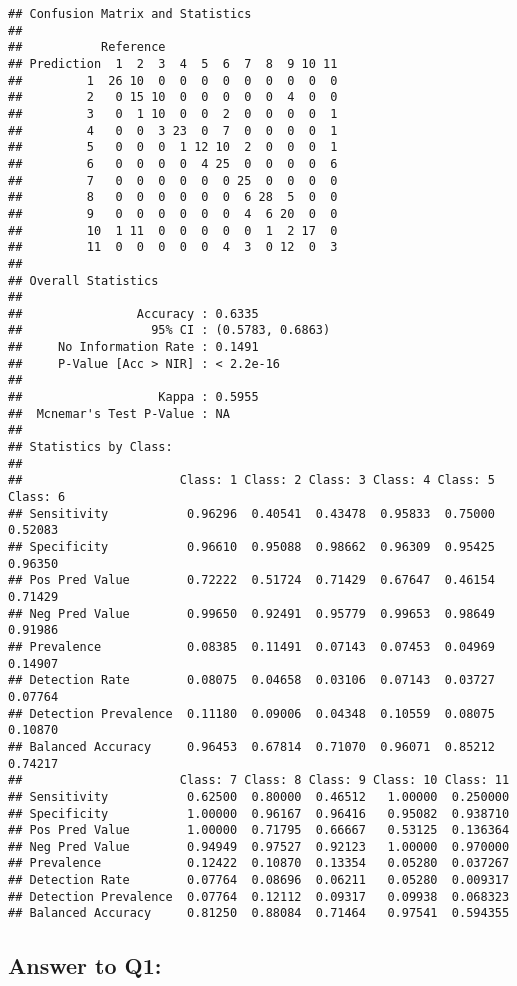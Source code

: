 \documentclass[]{article}
\begin{document}
\begin{verbatim}
## Confusion Matrix and Statistics
## 
##           Reference
## Prediction  1  2  3  4  5  6  7  8  9 10 11
##         1  26 10  0  0  0  0  0  0  0  0  0
##         2   0 15 10  0  0  0  0  0  4  0  0
##         3   0  1 10  0  0  2  0  0  0  0  1
##         4   0  0  3 23  0  7  0  0  0  0  1
##         5   0  0  0  1 12 10  2  0  0  0  1
##         6   0  0  0  0  4 25  0  0  0  0  6
##         7   0  0  0  0  0  0 25  0  0  0  0
##         8   0  0  0  0  0  0  6 28  5  0  0
##         9   0  0  0  0  0  0  4  6 20  0  0
##         10  1 11  0  0  0  0  0  1  2 17  0
##         11  0  0  0  0  0  4  3  0 12  0  3
## 
## Overall Statistics
##                                           
##                Accuracy : 0.6335          
##                  95% CI : (0.5783, 0.6863)
##     No Information Rate : 0.1491          
##     P-Value [Acc > NIR] : < 2.2e-16       
##                                           
##                   Kappa : 0.5955          
##  Mcnemar's Test P-Value : NA              
## 
## Statistics by Class:
## 
##                      Class: 1 Class: 2 Class: 3 Class: 4 Class: 5 Class: 6
## Sensitivity           0.96296  0.40541  0.43478  0.95833  0.75000  0.52083
## Specificity           0.96610  0.95088  0.98662  0.96309  0.95425  0.96350
## Pos Pred Value        0.72222  0.51724  0.71429  0.67647  0.46154  0.71429
## Neg Pred Value        0.99650  0.92491  0.95779  0.99653  0.98649  0.91986
## Prevalence            0.08385  0.11491  0.07143  0.07453  0.04969  0.14907
## Detection Rate        0.08075  0.04658  0.03106  0.07143  0.03727  0.07764
## Detection Prevalence  0.11180  0.09006  0.04348  0.10559  0.08075  0.10870
## Balanced Accuracy     0.96453  0.67814  0.71070  0.96071  0.85212  0.74217
##                      Class: 7 Class: 8 Class: 9 Class: 10 Class: 11
## Sensitivity           0.62500  0.80000  0.46512   1.00000  0.250000
## Specificity           1.00000  0.96167  0.96416   0.95082  0.938710
## Pos Pred Value        1.00000  0.71795  0.66667   0.53125  0.136364
## Neg Pred Value        0.94949  0.97527  0.92123   1.00000  0.970000
## Prevalence            0.12422  0.10870  0.13354   0.05280  0.037267
## Detection Rate        0.07764  0.08696  0.06211   0.05280  0.009317
## Detection Prevalence  0.07764  0.12112  0.09317   0.09938  0.068323
## Balanced Accuracy     0.81250  0.88084  0.71464   0.97541  0.594355
\end{verbatim}

\subsection{Answer to Q1:}\label{answer-to-q1}
\end{document}

